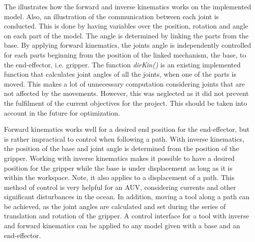 The  illustrates how the forward and inverse kinematics works on the implemented model. Also, an illustration of the communication between each joint is conducted. This is done by having variables over the position, rotation and angle on each part of the model. The angle is determined by linking the parts from the base. By applying forward kinematics, the joints angle is independently controlled for each parts beginning from the position of the linked mechanism, the base, to the end-effector, i.e. gripper. The function \textit{dirKin()} is an existing implemented function that calculates joint angles of all the joints, when one of the parts is moved. This makes a lot of unnecessary computation considering joints that are not affected by the movements. However, this was neglected as it did not prevent the fulfilment of the current objectives for the project. This should be taken into account in the future for optimization. 

Forward kinematics works well for a desired end position for the end-effector, but is rather impractical to control when following a path. With inverse kinematics, the position of the base and joint angle is determined from the position of the gripper. Working with inverse kinematics makes it possible to have a desired position for the gripper while the base is under displacement as long as it is within the workspace. Note, it also applies to a displacement of a path. This method of control is very helpful for an AUV, considering currents and other significant disturbances in the ocean. In addition, moving a tool along a path can be achieved, as the joint angles are calculated and set during the series of translation and rotation of the gripper. A control interface for a tool with inverse and forward kinematics can be applied to any model given with a base and an end-effector. 

